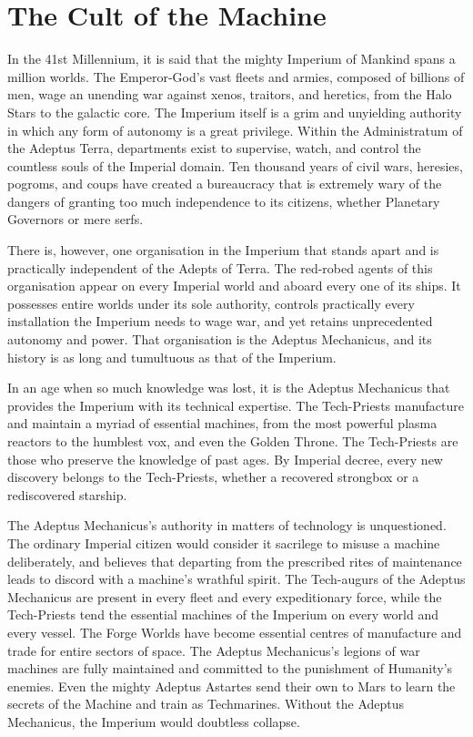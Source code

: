 \section{The Cult of the Machine}

In the 41st Millennium, it is said that the mighty Imperium of Mankind spans a million worlds. The Emperor-God's vast fleets and armies, composed of billions of men, wage an unending war against xenos, traitors, and heretics, from the Halo Stars to the galactic core. The Imperium itself is a grim and unyielding authority in which any form of autonomy is a great privilege. Within the Administratum of the Adeptus Terra, departments exist to supervise, watch, and control the countless souls of the Imperial domain. Ten thousand years of civil wars, heresies, pogroms, and coups have created a bureaucracy that is extremely wary of the dangers of granting too much independence to its citizens, whether Planetary Governors or mere serfs.

There is, however, one organisation in the Imperium that stands apart and is practically independent of the Adepts of Terra. The red-robed agents of this organisation appear on every Imperial world and aboard every one of its ships. It possesses entire worlds under its sole authority, controls practically every installation the Imperium needs to wage war, and yet retains unprecedented autonomy and power. That organisation is the Adeptus Mechanicus, and its history is as long and tumultuous as that of the Imperium.

In an age when so much knowledge was lost, it is the Adeptus Mechanicus that provides the Imperium with its technical expertise. The Tech-Priests manufacture and maintain a myriad of essential machines, from the most powerful plasma reactors to the humblest vox, and even the Golden Throne. The Tech-Priests are those who preserve the knowledge of past ages. By Imperial decree, every new discovery belongs to the Tech-Priests, whether a recovered strongbox or a rediscovered starship.

The Adeptus Mechanicus's authority in matters of technology is unquestioned. The ordinary Imperial citizen would consider it sacrilege to misuse a machine deliberately, and believes that departing from the prescribed rites of maintenance leads to discord with a machine's wrathful spirit. The Tech-augurs of the Adeptus Mechanicus are present in every fleet and every expeditionary force, while the Tech-Priests tend the essential machines of the Imperium on every world and every vessel. The Forge Worlds have become essential centres of manufacture and trade for entire sectors of space. The Adeptus Mechanicus's legions of war machines are fully maintained and committed to the punishment of Humanity's enemies. Even the mighty Adeptus Astartes send their own to Mars to learn the secrets of the Machine and train as Techmarines. Without the Adeptus Mechanicus, the Imperium would doubtless collapse.

